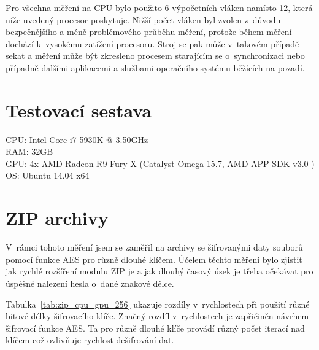 Pro všechna měření na CPU bylo použito 6 výpočetních vláken namísto 12, která níže uvedený
procesor poskytuje. Nižší počet vláken byl zvolen z~důvodu bezpečnějšího a méně problémového
průběhu měření, protože během měření dochází k~vysokému zatížení procesoru. Stroj se pak může
v~takovém případě sekat a měření může být zkresleno procesem starajícím se o~synchronizaci nebo
případně dalšími aplikacemi a službami operačního systému běžících na pozadí.

\section{Testovací sestava}
CPU: Intel Core i7-5930K @ 3.50GHz\\
RAM: 32GB\\
GPU: 4x AMD Radeon R9 Fury X (Catalyst Omega 15.7, AMD APP SDK v3.0 )\\
OS: Ubuntu 14.04 x64
\section{ZIP archivy}
V~rámci tohoto měření jsem se zaměřil na archivy se šifrovanými daty souborů pomocí funkce AES
pro různě dlouhé klíčem. Účelem těchto měření bylo zjistit jak rychlé rozšíření modulu ZIP je a
jak dlouhý časový úsek je třeba očekávat pro úspěšné nalezení hesla o~dané znakové délce. 

Tabulka~\ref{tab:zip_cpu_gpu_256} ukazuje rozdíly v~rychlostech při použití různé bitové délky
šifrovacího klíče. Značný rozdíl v~rychlostech je zapřičiněn návrhem šifrovací funkce AES. Ta
pro různě dlouhé klíče provádí různý počet iterací nad klíčem což ovlivňuje rychlost dešifrování
dat. 

